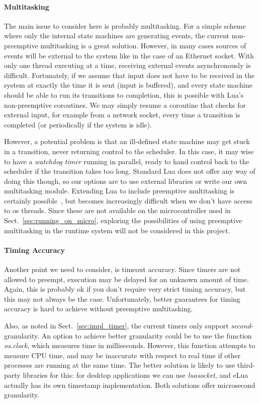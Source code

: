 \paragraph{Multitasking} The main issue to consider here is probably multitasking. For a simple scheme where only the internal state machines are generating events, the current non-preemptive multitasking is a great solution. However, in many cases sources of events will be external to the system like in the case of an Ethernet socket. With only one thread executing at a time, receiving external events asynchronously is difficult. Fortunately, if we assume that input does not have to be received in the system at exactly the time it is sent (input is buffered), and every state machine should be able to run its transitions to completion, this is possible with Lua's non-preemptive coroutines. We may simply resume a coroutine that checks for external input, for example from a network socket, every time a transition is completed (or periodically if the system is idle).

\noindent
However, a potential problem is that an ill-defined state machine may get stuck in a transition, never returning control to the scheduler. In this case, it may wise to have a \emph{watchdog timer} running in parallel, ready to hand control back to the scheduler if the transition takes too long. Standard Lua does not offer any way of doing this though, so our options are to use external libraries or write our own multitasking module. Extending Lua to include preemptive multitasking is certainly possible~\cite{techreport:lua_concurrent}, but becomes increasingly difficult when we don't have access to \gls{os} threads. Since these are not available on the microcontroller used in Sect.~\ref{sec:running_on_micro}, exploring the possibilities of using preemptive multitasking in the runtime system will not be considered in this project.

\paragraph{Timing Accuracy} Another point we need to consider, is timeout accuracy. Since timers are not allowed to preempt, execution may be delayed for an unknown amount of time. Again, this is probably ok if you don't require very strict timing accuracy, but this may not always be the case. Unfortunately, better guarantees for timing accuracy is hard to achieve without preemptive multitasking.

\noindent
Also, as noted in Sect.~\ref{sec:impl_timer}, the current timers only support \emph{second}-granularity. An option to achieve better granularity could be to use the function \emph{os.clock}, which measures time in milliseconds. However, this function attempts to measure CPU time, and may be inaccurate with respect to real time if other processes are running at the same time. The better solution is likely to use third-party libraries for this: for desktop applications we can use \emph{luasocket}, and eLua actually has its own timestamp implementation. Both solutions offer microsecond granularity.


